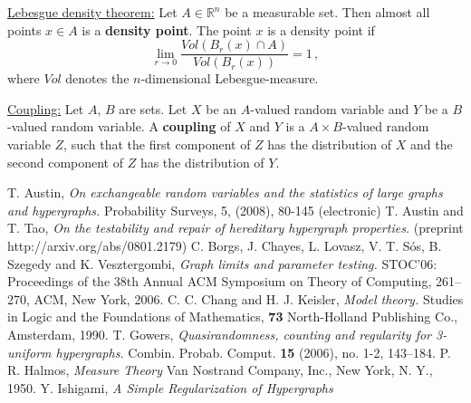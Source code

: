 \documentclass [11pt] {article}
\def\bR{{\mathbb R}}
\def\to{\rightarrow}
\begin{document}
\vskip 0.1in
\noindent
\underline{Lebesgue density theorem:}
Let $A\in \bR^n$ be a measurable set. Then almost all points $x\in A$ is
a {\bf density point}. The point $x$ is a density point if
$$\lim_{r\to 0} \frac{Vol (B_r(x)\cap A)} {Vol (B_r(x))}=1\,,$$
where $Vol$ denotes the $n$-dimensional Lebesgue-measure.

\vskip 0.1in
\noindent
\underline{Coupling:}
Let $A$, $B$ are sets. Let $X$ be an $A$-valued
random variable and $Y$ be a $B$-valued random variable. A {\bf coupling}
of $X$ and $Y$ is a $A\times B$-valued random variable $Z$, such that
the first component of $Z$ has the distribution of $X$ and the second
component of $Z$ has the distribution of $Y$.

\begin{thebibliography}{99}
 T. Austin,
{\em On exchangeable random variables and the statistics of large graphs and 
hypergraphs.}
Probability Surveys, 5, (2008), 80-145 (electronic)
 T. Austin and T. Tao,
{\em On the testability and repair of hereditary hypergraph properties.}
(preprint http://arxiv.org/abs/0801.2179)
 C. Borgs, J. Chayes, L. Lovasz, V. T. S\'os, B. Szegedy and
K. Vesztergombi,
{\em Graph limits and parameter testing.}
STOC'06: Proceedings of the 38th Annual ACM Symposium on Theory of Computing,
261--270, ACM, New York, 2006.
 C. C. Chang and H. J. Keisler,
{\em Model theory.} Studies in Logic and the Foundations of Mathematics, {\bf73} 
North-Holland Publishing Co., Amsterdam, 1990. 
 T. Gowers,
{\em Quasirandomness, counting and regularity for 3-uniform hypergraphs.}
 Combin. Probab. Comput. {\bf 15} (2006),  no. 1-2, 143--184.
 P. R.  Halmos,
{\em Measure Theory} Van Nostrand Company, Inc., New York, N. Y., 1950.
 Y. Ishigami,
{\em A Simple Regularization of Hypergraphs}


\end{thebibliography}
\end{document}
